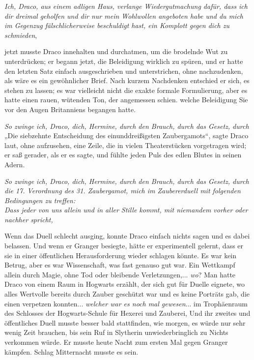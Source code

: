 {\emph{Ich, Draco, aus einem adligen Haus, verlange Wiedergutmachung dafür, dass ich dir dreimal geholfen und dir nur mein Wohlwollen angeboten habe und du mich im Gegenzug fälschlicherweise beschuldigt hast, ein Komplott gegen dich zu schmieden},

jetzt musste Draco innehalten und durchatmen, um die brodelnde Wut zu unterdrücken; er begann jetzt, die Beleidigung wirklich zu spüren, und er hatte den letzten Satz einfach ausgeschrieben und unterstrichen, ohne nachzudenken, als wäre es ein gewöhnlicher Brief. Nach kurzem Nachdenken entschied er sich, es stehen zu lassen; es war vielleicht nicht die exakte formale Formulierung, aber es hatte einen rauen, wütenden Ton, der angemessen schien. welche Beleidigung Sie vor den Augen Britanniens begangen hatte.

\emph{So zwinge ich, Draco, dich, Hermine, durch den Brauch, durch das Gesetz, durch}\\ „Die siebzehnte Entscheidung des einunddreißigsten Zaubergamots“, sagte Draco laut, ohne aufzusehen, eine Zeile, die in vielen Theaterstücken vorgetragen wird; er saß gerader, als er es sagte, und fühlte jeden Puls des edlen Blutes in seinen Adern.

\emph{So zwinge ich, Draco, dich, Hermine, durch den Brauch, durch das Gesetz, durch die 17. Verordnung des 31. Zaubergamot, mich im Zaubererduell mit folgenden Bedingungen zu treffen:}\\ \emph{Dass jeder von uns allein und in aller Stille kommt, mit niemandem vorher oder nachher spricht,}

Wenn das Duell schlecht ausging, konnte Draco einfach nichts sagen und es dabei belassen. Und wenn er Granger besiegte, hätte er experimentell gelernt, dass er sie in einer öffentlichen Herausforderung wieder schlagen könnte. Es war kein Betrug, aber es war Wissenschaft, was fast genauso gut war. Ein Wettkampf allein durch Magie, ohne Tod oder bleibende Verletzungen,... \emph{wo}? Man hatte Draco von einem Raum in Hogwarts erzählt, der sich gut für Duelle eignete, wo alles Wertvolle bereits durch Zauber geschützt war und es keine Porträts gab, die einen verpetzen konnten... \emph{welcher war es noch mal gewesen}... im Trophäenraum des Schlosses der Hogwarts-Schule für Hexerei und Zauberei, Und ihr zweites und öffentliches Duell musste besser bald stattfinden, wie morgen, es würde nur sehr wenig Zeit brauchen, bis sein Ruf in Slytherin unwiederbringlich zu Nichts verkommen würde. Er musste heute Nacht zum ersten Mal gegen Granger kämpfen. Schlag Mitternacht musste es sein.

}
